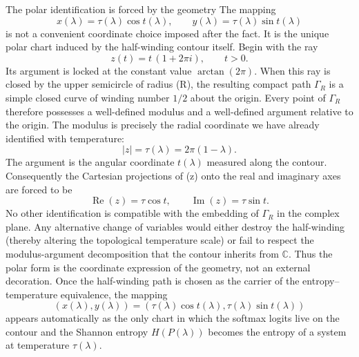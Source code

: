 The polar identification is forced by the geometry
The mapping
\[
x(\lambda)=\tau(\lambda)\cos t(\lambda),\qquad y(\lambda)=\tau(\lambda)\sin t(\lambda)
\]
is not a convenient coordinate choice imposed after the fact. It is the unique polar chart induced by the half-winding contour itself.
Begin with the ray
\[
z(t)=t\,(1+2\pi i),\qquad t>0.
\]
Its argument is locked at the constant value \(\arctan(2\pi)\). When this ray is closed by the upper semicircle of radius (R), the resulting compact path \(\Gamma_R\) is a simple closed curve of winding number \(1/2\) about the origin. Every point of \(\Gamma_R\) therefore possesses a well-defined modulus and a well-defined argument relative to the origin.  
The modulus is precisely the radial coordinate we have already identified with temperature:
\[
|z|=\tau(\lambda)=2\pi(1-\lambda).
\]
The argument is the angular coordinate \(t(\lambda)\) measured along the contour. Consequently the Cartesian projections of (z) onto the real and imaginary axes are forced to be
\[
\operatorname{Re}(z)=\tau\cos t,\qquad\operatorname{Im}(z)=\tau\sin t.
\]
No other identification is compatible with the embedding of \(\Gamma_R\) in the complex plane. Any alternative change of variables would either destroy the half-winding (thereby altering the topological temperature scale) or fail to respect the modulus-argument decomposition that the contour inherits from \(\mathbb{C}\).
Thus the polar form is the coordinate expression of the geometry, not an external decoration. Once the half-winding path is chosen as the carrier of the entropy–temperature equivalence, the mapping
\[
(x(\lambda),y(\lambda))=(\tau(\lambda)\cos t(\lambda),\tau(\lambda)\sin t(\lambda))
\]
appears automatically as the only chart in which the softmax logits live on the contour and the Shannon entropy \(H(P(\lambda))\) becomes the entropy of a system at temperature \(\tau(\lambda)\).
